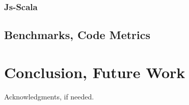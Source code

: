 \documentclass[preprint]{sigplanconf}
\begin{document}
\subsubsection{Js-Scala}

\subsection{Benchmarks, Code Metrics}

\section{Conclusion, Future Work}
\label{discussion}

%
%
\acks

Acknowledgments, if needed.



%
%
%
\end{document}
